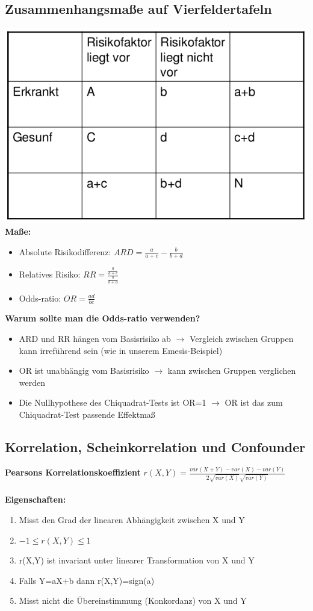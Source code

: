 \subsection{Zusammenhangsmaße auf Vierfeldertafeln}
\includegraphics[width=1.00\textwidth]{lectures/V5/pix/vft.png}
\textbf{Maße:}
\begin{itemize}
	\item Absolute Risikodifferenz: $\displaystyle ARD=\frac{a}{a+c}-\frac{b}{b+d}$
	\item Relatives Risiko: $RR=\displaystyle \frac{\displaystyle \frac{a}{a+c}}{\displaystyle \frac{b}{b+d}}$
	\item Odds-ratio: $\displaystyle OR=\frac{ad}{bc}$
\end{itemize}

\textbf{Warum sollte man die Odds-ratio verwenden?}
\begin{itemize}
	\item ARD und RR hängen vom Basisrisiko ab $\rightarrow$ Vergleich zwischen Gruppen kann irreführend sein (wie in unserem Emesis-Beispiel)
	\item OR ist unabhängig vom Basisrisiko $\rightarrow$ kann zwischen Gruppen verglichen werden
	\item Die Nullhypothese des Chiquadrat-Tests ist OR=1 $\rightarrow$ OR ist das zum Chiquadrat-Test passende Effektmaß
\end{itemize}

\newpage
\subsection{Korrelation, Scheinkorrelation und Confounder}
\textbf{Pearsons Korrelationskoeffizient}
$r(X,Y)=\displaystyle \frac{var(X+Y) - var(X) - var(Y)}{2 \sqrt{var(X)} \sqrt{var(Y)}}$
\\\\
\textbf{Eigenschaften:}
\begin{enumerate}
	\item Misst den Grad der linearen Abhängigkeit zwischen X und Y
	\item $-1 \leq r(X,Y) \leq 1$
	\item r(X,Y) ist invariant unter linearer Transformation von X und Y
	\item Falls Y=aX+b dann r(X,Y)=sign(a)
	\item Misst nicht die Übereinstimmung (Konkordanz) von X und Y
\end{enumerate}

